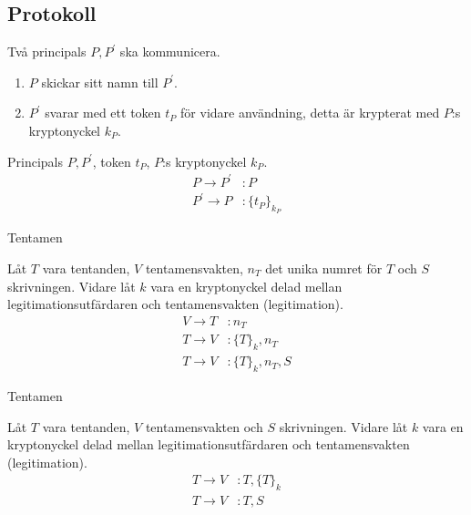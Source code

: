 \documentclass{beamer}
\theoremstyle{definition}
\theoremstyle{remark}
\begin{document}
\subsection{Protokoll}

\begin{frame}
  \begin{example}[Protokollbeskrivning]
    Två principals \(P, P^\prime\) ska kommunicera.
    \begin{enumerate}
      \item \(P\) skickar sitt namn till \(P^\prime\).
      \item \(P^\prime\) svarar med ett token \(t_P\) för vidare användning, 
        detta är krypterat med \(P\):s kryptonyckel \(k_P\).
    \end{enumerate}
  \end{example}
  \begin{example}
    Principals \(P, P^\prime\), token \(t_P\), \(P\):s kryptonyckel \(k_P\).
    \begin{align*}
      P\to P^\prime&\colon P \\
      P^\prime\to P&\colon \{t_P\}_{k_P}
    \end{align*}
  \end{example}
\end{frame}

\begin{frame}{Tentamen}
  \begin{example}
    Låt \(T\) vara tentanden, \(V\) tentamensvakten, \(n_T\) det unika numret 
    för \(T\) och \(S\) skrivningen.
    Vidare låt \(k\) vara en kryptonyckel delad mellan legitimationsutfärdaren 
    och tentamensvakten (legitimation).
    \begin{align*}
      V\to T&\colon n_T \\
      T\to V&\colon \{T\}_k, n_T \\
      T\to V&\colon \{T\}_k, n_T, S
    \end{align*}
  \end{example}
\end{frame}

\begin{frame}{Tentamen}
  \begin{example}
    Låt \(T\) vara tentanden, \(V\) tentamensvakten och \(S\) skrivningen.
    Vidare låt \(k\) vara en kryptonyckel delad mellan legitimationsutfärdaren 
    och tentamensvakten (legitimation).
    \begin{align*}
      T\to V&\colon T, \{T\}_k \\
      T\to V&\colon T, S
    \end{align*}
  \end{example}
\end{frame}
\end{document}
